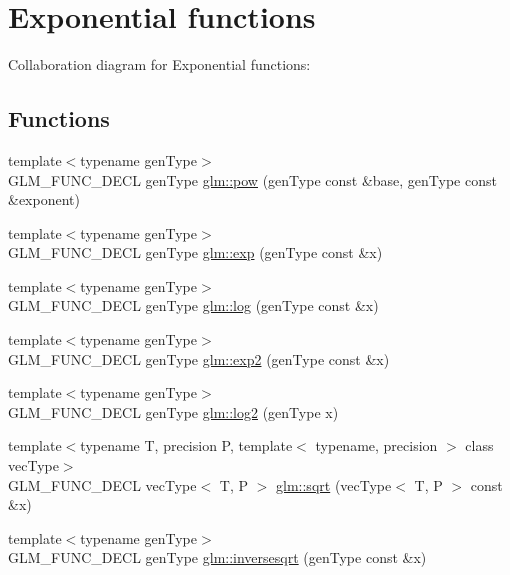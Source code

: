 \hypertarget{group__core__func__exponential}{
\section{Exponential functions}
\label{group__core__func__exponential}
}


Collaboration diagram for Exponential functions:\subsection*{Functions}
\begin{CompactItemize}
\item 
{\footnotesize template$<$typename genType$>$ }\\GLM\_\-FUNC\_\-DECL genType \hyperlink{group__core__func__exponential_gfdaffc3606f4ee7f415cd64ada108356}{glm::pow} (genType const \&base, genType const \&exponent)
\item 
{\footnotesize template$<$typename genType$>$ }\\GLM\_\-FUNC\_\-DECL genType \hyperlink{group__core__func__exponential_g0e7e69c5497cbbfe4afe08ee5449c553}{glm::exp} (genType const \&x)
\item 
{\footnotesize template$<$typename genType$>$ }\\GLM\_\-FUNC\_\-DECL genType \hyperlink{group__core__func__exponential_gce8148db3949f9260f6f883f8dbae808}{glm::log} (genType const \&x)
\item 
{\footnotesize template$<$typename genType$>$ }\\GLM\_\-FUNC\_\-DECL genType \hyperlink{group__core__func__exponential_g85f6efedaa47799e8f406481baca2171}{glm::exp2} (genType const \&x)
\item 
{\footnotesize template$<$typename genType$>$ }\\GLM\_\-FUNC\_\-DECL genType \hyperlink{group__core__func__exponential_g501534b7328bab23128aa15b316e483d}{glm::log2} (genType x)
\item 
{\footnotesize template$<$typename T, precision P, template$<$ typename, precision $>$ class vecType$>$ }\\GLM\_\-FUNC\_\-DECL vecType$<$ T, P $>$ \hyperlink{group__core__func__exponential_gfe49b7b63045b6ab94bffbcd7e7a7bc8}{glm::sqrt} (vecType$<$ T, P $>$ const \&x)
\item 
{\footnotesize template$<$typename genType$>$ }\\GLM\_\-FUNC\_\-DECL genType \hyperlink{group__core__func__exponential_ga190c750b7eefaeb15431987d41177d1}{glm::inversesqrt} (genType const \&x)
\end{CompactItemize}


